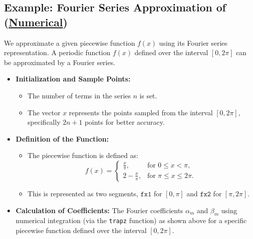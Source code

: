 \documentclass[12pt]{report} %
\begin{document}
\subsection*{Example: Fourier Series Approximation of (\href{https://github.com/abhx7/PseudoSpectral-Methods-in-Optimal-Control/blob/main/Codes/fourier_interpolation_sincos_triangle_wave.m}{Numerical})}
We approximate a given piecewise function \( f(x) \) using its Fourier series representation. A periodic function \( f(x) \) defined over the interval \( [0, 2\pi] \) can be approximated by a Fourier series.
\begin{itemize}
    \item \textbf{Initialization and Sample Points:}
    \begin{itemize}
        \item The number of terms in the series \( n \) is set.
        \item The vector \( x \) represents the points sampled from the interval \( [0, 2\pi] \), specifically \( 2n + 1 \) points for better accuracy.
    \end{itemize}
    
    \item \textbf{Definition of the Function:}
    \begin{itemize}
        \item The piecewise function is defined as:
        \[
        f(x) = 
        \begin{cases} 
        \frac{x}{\pi}, & \text{for } 0 \leq x < \pi, \\
        2 - \frac{x}{\pi}, & \text{for } \pi \leq x \leq 2\pi.
        \end{cases}
        \]
        \item This is represented as two segments, \( \texttt{fx1} \) for \( [0, \pi] \) and \( \texttt{fx2} \) for \( [\pi, 2\pi] \).
    \end{itemize}
    
    \item \textbf{Calculation of Coefficients:}
    The Fourier coefficients \( \alpha_m \) and \( \beta_m \) using numerical integration (via the \texttt{trapz} function) as shown above for a specific piecewise function defined over the interval \( [0, 2\pi] \). 
    

\end{itemize}
\end{document}
